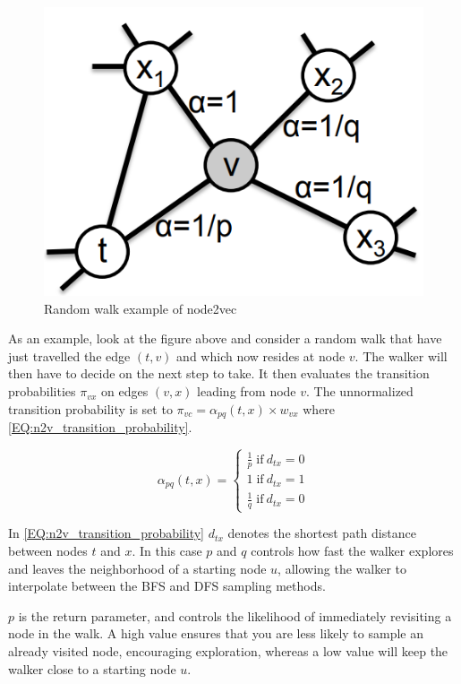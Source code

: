 \begin{figure}[H]
\centering
  \includegraphics[scale=0.5]{Article/figures/randomwalkexample.png}
  \caption{Random walk example of node2vec \cite{Node2vec}}
  \label{fig:n2v_randomwalk}
\end{figure}

As an example, look at the figure above and consider a random walk that have just travelled the edge $(t, v)$ and which now resides at node $v$. The walker will then have to decide on the next step to take. It then evaluates the transition probabilities $\pi_{vx}$ on edges $(v,x)$ leading from node $v$. The unnormalized transition probability is set to $\pi_{vc} = \alpha_{pq} (t,x) \times w_{vx}$ where \autoref{EQ:n2v_transition_probability}.

\begin{equation}\label{EQ:n2v_transition_probability}
\alpha_{pq} (t,x) =
\begin{cases} 
	\frac{1}{p} \; \text{if} \:  d_{tx} = 0 \\
	1 \; \text{if} \: d_{tx} = 1 \\
	\frac{1}{q} \; \text{if} \: d_{tx} = 0
\end{cases}
\end{equation}


In \autoref{EQ:n2v_transition_probability} $d_{tx}$ denotes the shortest path distance between nodes $t$ and $x$. In this case $p$ and $q$ controls how fast the walker explores and leaves the neighborhood of a starting node $u$, allowing the walker to interpolate between the BFS and DFS sampling methods.

$p$ is the return parameter, and controls the likelihood of immediately revisiting a node in the walk. A high value ensures that you are less likely to sample an already visited node, encouraging exploration, whereas a low value will keep the walker close to a starting node $u$.


